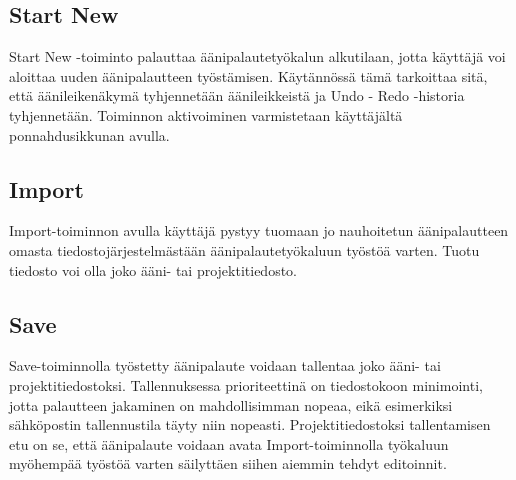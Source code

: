 \documentclass[utf8]{gradu3}
\begin{document}
\subsection{Start New}

Start New -toiminto palauttaa äänipalautetyökalun alkutilaan, jotta käyttäjä voi aloittaa uuden äänipalautteen työstämisen. Käytännössä tämä tarkoittaa sitä, että äänileikenäkymä tyhjennetään äänileikkeistä ja Undo - Redo -historia tyhjennetään. Toiminnon aktivoiminen varmistetaan käyttäjältä ponnahdusikkunan avulla.

\subsection{Import}

Import-toiminnon avulla käyttäjä pystyy tuomaan jo nauhoitetun äänipalautteen omasta tiedostojärjestelmästään äänipalautetyökaluun työstöä varten. Tuotu tiedosto voi olla joko ääni- tai projektitiedosto.

\subsection{Save}

Save-toiminnolla työstetty äänipalaute voidaan tallentaa joko ääni- tai projektitiedostoksi. Tallennuksessa prioriteettinä on tiedostokoon minimointi, jotta palautteen jakaminen on mahdollisimman nopeaa, eikä esimerkiksi sähköpostin tallennustila täyty niin nopeasti. Projektitiedostoksi tallentamisen etu on se, että äänipalaute voidaan avata Import-toiminnolla työkaluun myöhempää työstöä varten säilyttäen siihen aiemmin tehdyt editoinnit.
\end{document}

